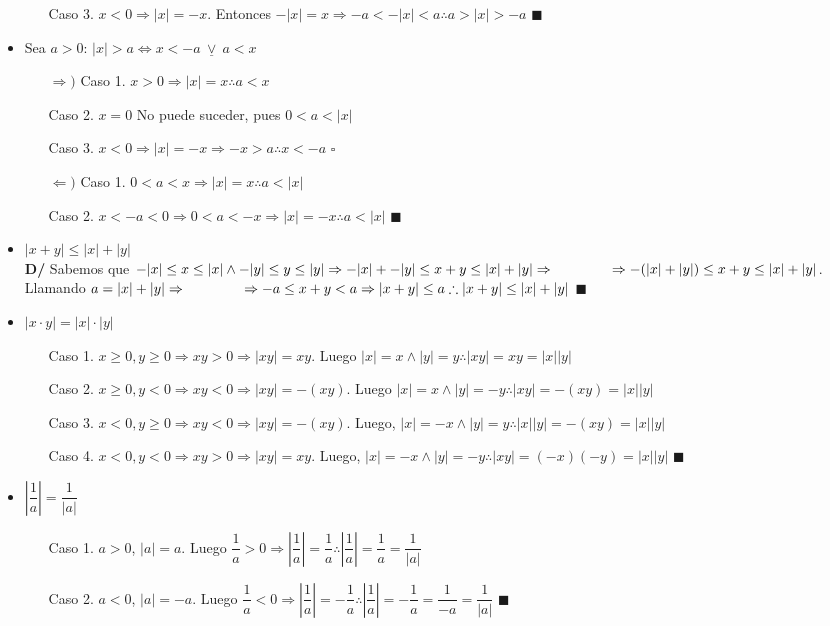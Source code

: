 \documentclass[11pt,a4paper]{article}
\newcommand*{\QEDA}{\null\nobreak\hfill\ensuremath{\blacksquare}}
\newcommand*{\QEDB}{\null\nobreak\hfill\ensuremath{\square}}
\begin{document}
\begin{itemize}
\begin{enumerate}
\item [Caso 3. ] $x<0 \Rightarrow |x| = -x$. Entonces $-|x| = x \Rightarrow -a < -|x| < a \therefore a > |x| > -a$ \QEDA
\end{enumerate}
\item Sea $a>0$: $|x| > a \iff x < -a\ \underline{\lor}\ a < x$
\begin{enumerate}
\item [$\Rightarrow)$ Caso 1. ] $x>0 \Rightarrow |x| = x \therefore a < x$
\item [Caso 2. ] $x=0$ No puede suceder, pues $0 < a < |x|$
\item [Caso 3. ] $x<0 \Rightarrow |x| = -x \Rightarrow -x > a \therefore x < -a$ \QEDB
\item [$\Leftarrow)$ Caso 1. ] $0<a<x \Rightarrow |x| = x \therefore a < |x|$
\item [Caso 2. ] $x<-a<0 \Rightarrow 0 < a < -x \Rightarrow |x| = -x \therefore a < |x|$ \QEDA
\end{enumerate}
\item $|x+y| \leq |x| + |y|$\\
\textbf{D/} Sabemos que $-|x| \leq x \leq |x| \land -|y| \leq y \leq |y| \Rightarrow -|x| + - |y| \leq x + y \leq |x| + |y| \Rightarrow \\ \indent \ \ \ \ \ \ \ \Rightarrow -(|x|+|y|) \leq x+y \leq |x|+|y|$. Llamando $a = |x|+|y| \Rightarrow \\ \indent \ \ \ \ \ \ \ \Rightarrow-a \leq x + y < a \Rightarrow |x+y| \leq a \therefore |x+y| \leq |x|+|y|$ \QEDA
\item $|x \cdot y| = |x| \cdot |y|$
\begin{enumerate}
\item [Caso 1. ] $x\geq0, y\geq0 \Rightarrow xy > 0 \Rightarrow |xy| = xy$. Luego $|x| = x \land |y| = y \therefore |xy|= xy = |x||y|$
\item [Caso 2. ] $x\geq0, y < 0 \Rightarrow xy<0 \Rightarrow |xy|=-(xy)$. Luego $|x|=x \land |y|=-y \therefore |xy| = -(xy) = |x||y|$ 
\item [Caso 3. ] $x < 0, y\geq0 \Rightarrow xy < 0 \Rightarrow |xy| = -(xy)$. Luego, $|x|=-x \land |y|=y \therefore |x||y| = -(xy) = |x||y|$
\item [Caso 4. ] $x < 0, y < 0 \Rightarrow xy>0 \Rightarrow |xy| = xy$. Luego, $|x|=-x \land |y|=-y \therefore |xy| = (-x)(-y) = |x||y|$ \QEDA
\newpage
\end{enumerate}
\item $\left|\dfrac{1}{a}\right| = \dfrac{1}{|a|}$
\begin{enumerate}
\item [Caso 1. ] $a>0$, $|a| = a$. Luego $\dfrac{1}{a} > 0 \Rightarrow \left|\dfrac{1}{a}\right| = \dfrac{1}{a} \therefore \left|\dfrac{1}{a}\right| = \dfrac{1}{a} = \dfrac{1}{|a|}$
\item [Caso 2. ] $a<0$, $|a| = -a$. Luego $\dfrac{1}{a} < 0 \Rightarrow \left|\dfrac{1}{a}\right| = -\dfrac{1}{a} \therefore \left|\dfrac{1}{a}\right| = -\dfrac{1}{a} = \dfrac{1}{-a} = \dfrac{1}{|a|}$ \QEDA
\end{enumerate}


\end{itemize}
\end{document}
